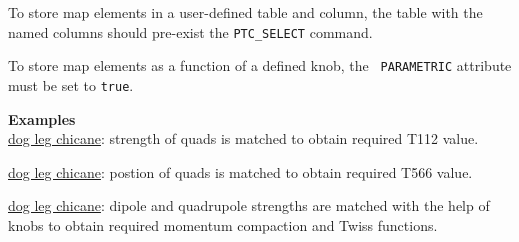 To store map elements in a user-defined table and column, the table with the
named columns should pre-exist the {\tt PTC\_SELECT} command.

To store map elements as a function of a defined knob, the {\tt
  PARAMETRIC} attribute must be set to {\tt true}.


{\bf Examples}\\

\href{http://cern.ch/frs/mad-X_examples/ptc_madx_interface/ptc_secordmatch/chicane.madx}{dog
  leg chicane}: strength of quads is matched to obtain required T112
value.    

\href{http://cern.ch/frs/mad-X_examples/ptc_madx_interface/eplacement/chicane.madx}{dog
  leg chicane}: postion of quads is matched to obtain required T566
value.   

\href{http://cern.ch/frs/mad-X_examples/ptc_madx_interface/matchwithknobs/matchwithknobs.madx}{dog
  leg chicane}: dipole and quadrupole strengths are matched with the
help of knobs to obtain required momentum compaction and Twiss
functions.   








